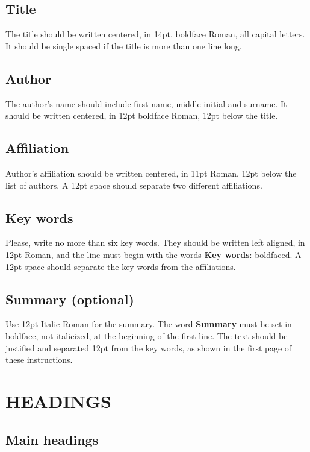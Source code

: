 \documentclass{particles2015}
\begin{document}
\subsection{Title}

The title should be written centered, in 14pt, boldface Roman, all
capital letters. It should be single spaced if the title is more
than one line long.

\subsection{Author}

The author's name should include first name, middle initial and
surname. It should be written centered, in 12pt boldface Roman,
12pt below the title.

\subsection{Affiliation}

Author's affiliation should be written centered, in 11pt Roman,
12pt below the list of authors. A 12pt space should separate two
different affiliations.

\subsection{Key words}

Please, write no more than six key words. They should be written
left aligned, in 12pt Roman, and the line must begin with the
words {\bf Key words}: boldfaced. A 12pt space should separate the
key words from the affiliations.

\subsection {Summary (optional)}

Use 12pt Italic Roman for the summary. The word {\bf Summary} must
be set in boldface, not italicized, at the beginning of the first
line. The text should be justified and separated 12pt from the key
words, as shown in the first page of these instructions.

\section{HEADINGS}

\subsection{Main headings}
\end{document}
